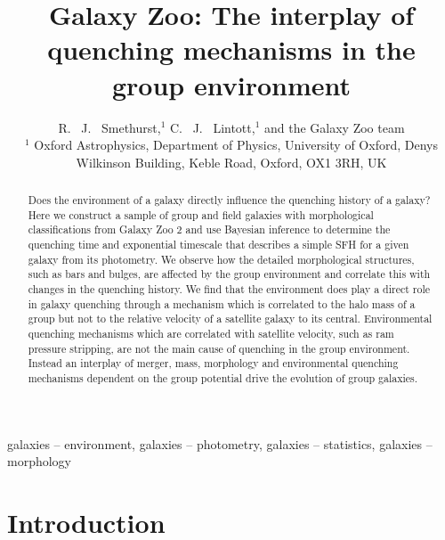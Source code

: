 \documentclass[useAMS,usenatbib]{mn2e}
\begin{document}
\title[Group environment quenching mechanisms]{Galaxy Zoo: The interplay of quenching mechanisms in the group environment}
\author[Smethurst et al. 2015]{R. ~J. ~Smethurst,$^{1}$ C. ~J. ~Lintott,$^{1}$ and the Galaxy Zoo team \footnotemark[1]
\\ $^1$ Oxford Astrophysics, Department of Physics, University of Oxford, Denys Wilkinson Building, Keble Road, Oxford, OX1 3RH, UK 
}

\maketitle

\begin{abstract}
Does the environment of a galaxy directly influence the quenching history of a galaxy? Here we construct a sample of group and field galaxies with morphological classifications from Galaxy Zoo 2 and use Bayesian inference to determine the quenching time and exponential timescale that describes a simple SFH for a given galaxy from its photometry. We observe how the detailed morphological structures, such as bars and bulges, are affected by the group environment and correlate this with changes in the quenching history.  We find that the environment does play a direct role in galaxy quenching through a mechanism which is correlated to the halo mass of a group but not to the relative velocity of a satellite galaxy to its central. Environmental quenching mechanisms which are correlated with satellite velocity, such as ram pressure stripping, are not the main cause of quenching in the group environment. Instead an interplay of merger, mass, morphology and environmental quenching mechanisms dependent on the group potential drive the evolution of group galaxies. 

\end{abstract}

\begin{keywords}
galaxies -- environment, galaxies -- photometry, galaxies -- statistics, galaxies -- morphology
\end{keywords}


\section{Introduction}\label{sec:intro}
 
\end{document}
